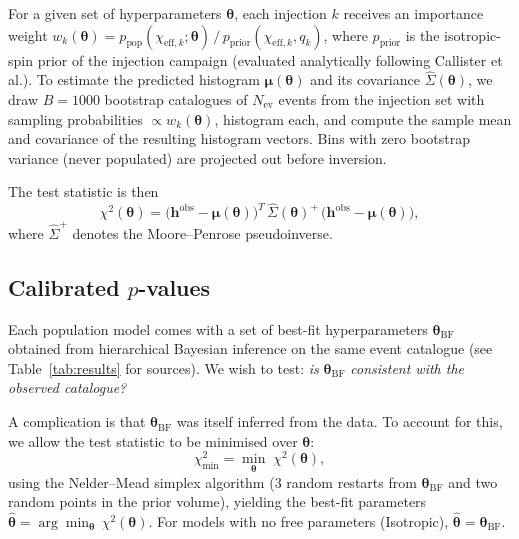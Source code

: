 \documentclass[11pt,a4paper]{article}
\newcommand{\Nev}{\ensuremath{N_\mathrm{ev}}\xspace}
\begin{document}
For a given set of hyperparameters $\boldsymbol{\theta}$, each injection $k$
receives an importance weight
$w_k(\boldsymbol{\theta}) = p_\mathrm{pop}(\chi_{\mathrm{eff},k};\boldsymbol{\theta})
\,/\, p_\mathrm{prior}(\chi_{\mathrm{eff},k}, q_k)$,
where $p_\mathrm{prior}$ is the isotropic-spin prior of the injection campaign
(evaluated analytically following Callister et al.).
To estimate the predicted histogram $\boldsymbol{\mu}(\boldsymbol{\theta})$
and its covariance $\hat{\Sigma}(\boldsymbol{\theta})$,
we draw $B = 1000$ bootstrap catalogues of \Nev events from the injection set
with sampling probabilities $\propto w_k(\boldsymbol{\theta})$, histogram
each, and compute the sample mean and covariance of the resulting histogram
vectors.  Bins with zero bootstrap variance (never populated) are projected
out before inversion.

The test statistic is then
\begin{equation}\label{eq:chi2}
  \chi^2(\boldsymbol{\theta})
  = \bigl(\mathbf{h}^\mathrm{obs} - \boldsymbol{\mu}(\boldsymbol{\theta})\bigr)^T
    \,\hat{\Sigma}(\boldsymbol{\theta})^{+}\,
    \bigl(\mathbf{h}^\mathrm{obs} - \boldsymbol{\mu}(\boldsymbol{\theta})\bigr),
\end{equation}
where $\hat{\Sigma}^{+}$ denotes the Moore--Penrose pseudoinverse.

\subsection{Calibrated $p$-values}

Each population model comes with a set of best-fit hyperparameters
$\boldsymbol{\theta}_\mathrm{BF}$ obtained from hierarchical Bayesian
inference on the same event catalogue (see Table~\ref{tab:results} for
sources).  We wish to test: \emph{is} $\boldsymbol{\theta}_\mathrm{BF}$
\emph{consistent with the observed catalogue?}

A complication is that $\boldsymbol{\theta}_\mathrm{BF}$ was itself inferred
from the data.  To account for this, we allow the test statistic to be
minimised over $\boldsymbol{\theta}$:
\begin{equation}\label{eq:chi2min}
  \chi^2_\mathrm{min} = \min_{\boldsymbol{\theta}}\;
  \chi^2(\boldsymbol{\theta}),
\end{equation}
using the Nelder--Mead simplex algorithm (3 random restarts from
$\boldsymbol{\theta}_\mathrm{BF}$ and two random points in the prior
volume), yielding the best-fit parameters
$\hat{\boldsymbol{\theta}} = \arg\min_{\boldsymbol{\theta}}\,
\chi^2(\boldsymbol{\theta})$.
For models with no free parameters (Isotropic),
$\hat{\boldsymbol{\theta}} = \boldsymbol{\theta}_\mathrm{BF}$.
\end{document}
